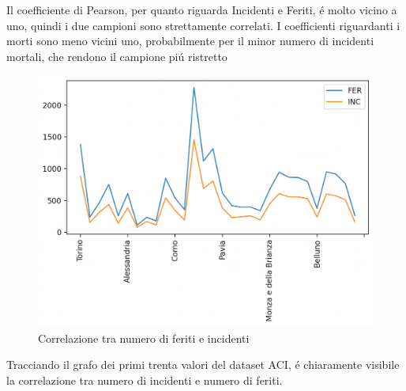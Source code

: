 \documentclass[a4paper]{report}
\begin{document}
Il coefficiente di Pearson, per quanto riguarda Incidenti e Feriti, 
\'e molto vicino a uno, quindi i due campioni sono strettamente correlati.
I coefficienti riguardanti i morti sono meno vicini uno, probabilmente per il minor numero 
di incidenti mortali, che rendono il campione pi\'u ristretto

\begin{figure}[!ht]
    \includegraphics[width=\linewidth]{../src/incidenti/incidenti_aci/comuni/corr_incidenti_feriti.png}
    \caption{Correlazione tra numero di feriti e incidenti}
    \label{fig:corr_incidenti_feriti}
\end{figure}

Tracciando il grafo dei primi trenta valori del dataset ACI, 
\'e chiaramente visibile la correlazione tra numero di incidenti e numero di feriti.



\clearpage
\end{document}
